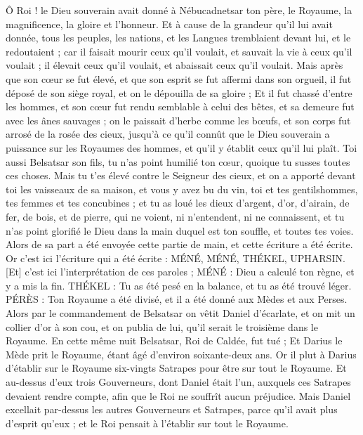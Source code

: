 \begin{multicols}{2}
Ô Roi ! le Dieu souverain avait donné à Nébucadnetsar ton père, le Royaume, la magnificence, la gloire et l'honneur.
Et à cause de la grandeur qu'il lui avait donnée, tous les peuples, les nations, et les Langues tremblaient devant lui, et le redoutaient ; car il faisait mourir ceux qu'il voulait, et sauvait la vie à ceux qu'il voulait ; il élevait ceux qu'il voulait, et abaissait ceux qu'il voulait.
Mais après que son cœur se fut élevé, et que son esprit se fut affermi dans son orgueil, il fut déposé de son siège royal, et on le dépouilla de sa gloire ;
Et il fut chassé d'entre les hommes, et son cœur fut rendu semblable à celui des bêtes, et sa demeure fut avec les ânes sauvages ; on le paissait d'herbe comme les bœufs, et son corps fut arrosé de la rosée des cieux, jusqu'à ce qu'il connût que le Dieu souverain a puissance sur les Royaumes des hommes, et qu'il y établit ceux qu'il lui plaît.
Toi aussi Belsatsar son fils, tu n'as point humilié ton cœur, quoique tu susses toutes ces choses.
Mais tu t'es élevé contre le Seigneur des cieux, et on a apporté devant toi les vaisseaux de sa maison, et vous y avez bu du vin, toi et tes gentilshommes, tes femmes et tes concubines ; et tu as loué les dieux d'argent, d'or, d'airain, de fer, de bois, et de pierre, qui ne voient, ni n'entendent, ni ne connaissent, et tu n'as point glorifié le Dieu dans la main duquel est ton souffle, et toutes tes voies.
Alors de sa part a été envoyée cette partie de main, et cette écriture a été écrite.
Or c'est ici l'écriture qui a été écrite : MÉNÉ, MÉNÉ, THÉKEL, UPHARSIN.
[Et] c'est ici l'interprétation de ces paroles ; MÉNÉ : Dieu a calculé ton règne, et y a mis la fin.
THÉKEL : Tu as été pesé en la balance, et tu as été trouvé léger.
PÉRÈS : Ton Royaume a été divisé, et il a été donné aux Mèdes et aux Perses.
Alors par le commandement de Belsatsar on vêtit Daniel d'écarlate, et on mit un collier d'or à son cou, et on publia de lui, qu'il serait le troisième dans le Royaume.
En cette même nuit Belsatsar, Roi de Caldée, fut tué ;
Et Darius le Mède prit le Royaume, étant âgé d'environ soixante-deux ans.
\VerseOne{}Or il plut à Darius d'établir sur le Royaume six-vingts Satrapes pour être sur tout le Royaume.
Et au-dessus d'eux trois Gouverneurs, dont Daniel était l'un, auxquels ces Satrapes devaient rendre compte, afin que le Roi ne souffrît aucun préjudice.
Mais Daniel excellait par-dessus les autres Gouverneurs et Satrapes, parce qu'il avait plus d'esprit qu'eux ; et le Roi pensait à l'établir sur tout le Royaume.

\end{multicols}
